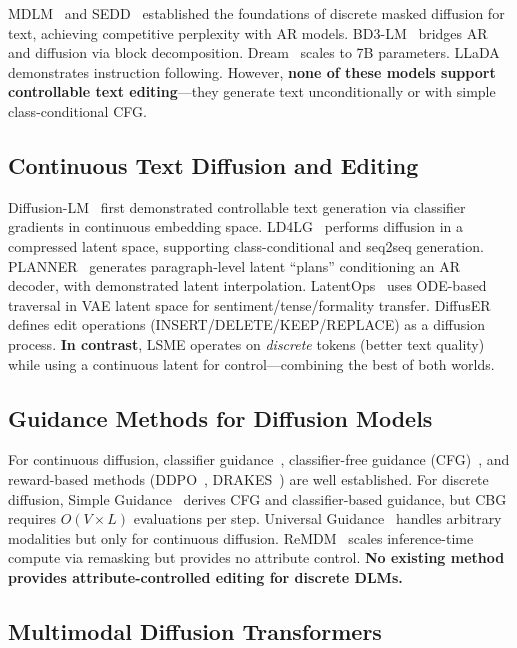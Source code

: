 \documentclass{article}
\begin{document}
MDLM~\cite{mdlm2024} and SEDD~\cite{sedd2024} established the foundations of discrete masked diffusion for text, achieving competitive perplexity with AR models.
BD3-LM~\cite{bd3lm2025} bridges AR and diffusion via block decomposition.
Dream~\cite{dream2025} scales to 7B parameters.
LLaDA~\cite{llada2025} demonstrates instruction following.
However, \textbf{none of these models support controllable text editing}---they generate text unconditionally or with simple class-conditional CFG.

\subsection{Continuous Text Diffusion and Editing}

Diffusion-LM~\cite{diffusionlm2022} first demonstrated controllable text generation via classifier gradients in continuous embedding space.
LD4LG~\cite{ld4lg2023} performs diffusion in a compressed latent space, supporting class-conditional and seq2seq generation.
PLANNER~\cite{planner2023} generates paragraph-level latent ``plans'' conditioning an AR decoder, with demonstrated latent interpolation.
LatentOps~\cite{latentops2023} uses ODE-based traversal in VAE latent space for sentiment/tense/formality transfer.
DiffusER~\cite{diffuser2023} defines edit operations (INSERT/DELETE/KEEP/REPLACE) as a diffusion process.
\textbf{In contrast}, LSME operates on \emph{discrete} tokens (better text quality) while using a continuous latent for control---combining the best of both worlds.

\subsection{Guidance Methods for Diffusion Models}

For continuous diffusion, classifier guidance~\cite{dhariwal2021}, classifier-free guidance (CFG)~\cite{ho2022cfg}, and reward-based methods (DDPO~\cite{ddpo2024}, DRAKES~\cite{drakes2025}) are well established.
For discrete diffusion, Simple Guidance~\cite{simpleguidance2025} derives CFG and classifier-based guidance, but CBG requires $O(V \times L)$ evaluations per step.
Universal Guidance~\cite{universalguidance2024} handles arbitrary modalities but only for continuous diffusion.
ReMDM~\cite{remdm2025} scales inference-time compute via remasking but provides no attribute control.
\textbf{No existing method provides attribute-controlled editing for discrete DLMs.}

\subsection{Multimodal Diffusion Transformers}
\end{document}
